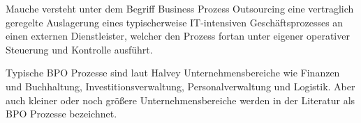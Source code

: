 Mauche versteht unter dem Begriff Business Prozess Outsourcing eine vertraglich geregelte Auslagerung eines typischerweise IT-intensiven Geschäftsprozesses an einen externen Dienstleister, welcher den Prozess fortan unter eigener operativer Steuerung und Kontrolle ausführt.
\cite[3]{mauchle2012business}

Typische BPO Prozesse sind laut Halvey Unternehmensbereiche wie Finanzen und Buchhaltung, Investitionsverwaltung, Personalverwaltung und Logistik. Aber auch kleiner oder noch größere Unternehmensbereiche werden in der Literatur als BPO Prozesse bezeichnet. \cite[4]{halvey2007business}
 







